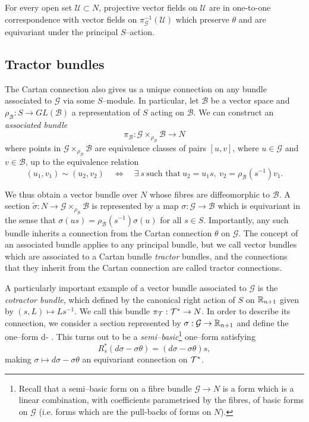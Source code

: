 \begin{rmk} \label{rmk:theta_symmetry}
For every open set $\mathcal{U}\subset N$, projective vector fields on $\mathcal{U}$ are in one-to-one correspondence with vector fields on $\pi_\mathcal{G}^{-1}(\mathcal{U})$
which preserve $\theta$ and are equivariant under the principal $S$--action.
\end{rmk}






\subsection{Tractor bundles}
The Cartan connection also gives us a unique connection on any bundle associated to $\mathcal{G}$ via some $S$--module. In particular, let $\mathcal{B}$ be a vector space and $\rho_\mathcal{B}:S\rightarrow GL(\mathcal{B})$ a representation of $S$ acting on $\mathcal{B}$. We can construct an \textit{associated bundle}
\[\pi_\mathcal{B}:\mathcal{G}\times_{\rho_\mathcal{B}} \mathcal{B}\rightarrow N \]
where points in $\mathcal{G}\times_{\rho_\mathcal{B}} \mathcal{B}$ are equivalence classes of pairs $[u,v]$, where $u\in \mathcal{G}$ and $v\in \mathcal{B}$, up to the equivalence relation
\[
(u_1,v_1)\sim (u_2,v_2) \quad \Leftrightarrow \quad \exists\ s\ \mbox{such that}\  u_2=u_1 s,\  v_2 = \rho_\mathcal{B}(s^{-1}) v_1.
\]

We thus obtain a vector bundle over $N$ whose fibres are diffeomorphic to $\mathcal{B}$. A section $\tilde{\sigma}:N\rightarrow \mathcal{G}\times_{\rho_\mathcal{B}} \mathcal{B}$ is represented by a map ${\sigma}:\mathcal{G}\rightarrow \mathcal{B}$ which is equivariant in the sense that ${\sigma}(us)=\rho_\mathcal{B}(s^{-1}){\sigma}(u)$ for all $s\in S$. Importantly, any such bundle inherits a connection from the Cartan connection $\theta$ on $\mathcal{G}$. The concept of an associated bundle applies to any principal bundle, but we call vector bundles which are associated to a Cartan bundle \textit{tractor} bundles, and the connections that they inherit from the Cartan connection are called tractor connections.

A particularly important example of a vector bundle associated to $\mathcal{G}$ is the \textit{cotractor bundle}, which defined by the canonical right action of $S$ on $\mathbb{R}_{n+1}$ given by $(s,L)\mapsto Ls^{-1}$. We call this bundle $\pi_\mathcal{T}:\mathcal{T}^*\rightarrow N$. In order to describe its connection, we consider a section represented by $\sigma:\mathcal{G}\rightarrow\mathbb{R}_{n+1}$ and define the one--form
\be \label{eq:df-ftheta}
d\sigma - \sigma\theta.
\ee
This turns out to be a \textit{semi--basic}\footnote{Recall that a semi--basic form on a fibre bundle $\mathcal{G}\rightarrow N$ is a form which is a linear combination, with coefficients parametrised by the fibres, of basic forms on $\mathcal{G}$ (i.e. forms which are the pull-backs of forms on $N$).} one--form satisfying
\[
R_s^*(d\sigma-\sigma\theta) = (d\sigma - \sigma\theta)s,
\]
making $\sigma\mapsto d\sigma-\sigma\theta$ an equivariant connection on $\mathcal{T}^*$.

